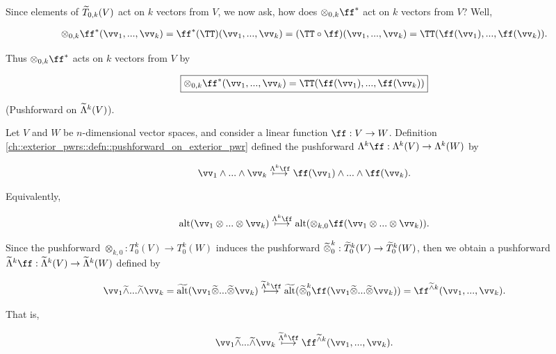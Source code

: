 \begin{deriv}
    Since elements of $\widetilde{T}_{0,k}(V)$ act on $k$ vectors from $V$, we now ask, how does $\otimes_{0, k} \ff^*$ act on $k$ vectors from $V$? Well,
    
    \begin{align*}
        \otimes_{0, k} \ff^*(\vv_1, ..., \vv_k) = \ff^*(\TT)(\vv_1, ..., \vv_k) = (\TT \circ \ff)(\vv_1, ..., \vv_k) = \TT(\ff(\vv_1), ..., \ff(\vv_k)).
    \end{align*}
    
    Thus $\otimes_{0, k} \ff^*$ acts on $k$ vectors from $V$ by
    
    \begin{align*}
        \boxed
        {
            \otimes_{0, k} \ff^*(\vv_1, ..., \vv_k) = \TT(\ff(\vv_1), ..., \ff(\vv_k))
        }
    \end{align*}
\end{deriv}

\begin{deriv}
    (Pushforward on $\widetilde{\Lambda}^k(V)$).
    
    Let $V$ and $W$ be $n$-dimensional vector spaces, and consider a linear function $\ff:V \rightarrow W$. Definition \ref{ch::exterior_pwrs::defn::pushforward_on_exterior_pwr} defined the pushforward $\Lambda^k \ff:\Lambda^k(V) \rightarrow \Lambda^k(W)$ by
    
    \begin{align*}
        \vv_1 \wedge ... \wedge \vv_k \overset{\Lambda^k \ff}{\longmapsto} \ff(\vv_1) \wedge ... \wedge \ff(\vv_k).
    \end{align*}
    
    Equivalently,
    
    \begin{align*}
        \alt(\vv_1 \otimes ... \otimes \vv_k) \overset{\Lambda^k \ff}{\longmapsto} \alt(\otimes_{k, 0} \ff(\vv_1 \otimes ... \otimes 
        \vv_k)).
    \end{align*}
    
    Since the pushforward $\otimes_{k, 0}:T^k_0(V) \rightarrow T^k_0(W)$ induces the pushforward $\widetilde{\otimes}^k_0:\widetilde{T}^k_0(V) \rightarrow \widetilde{T}^k_0(W)$, then we obtain a pushforward $\tLambda^k \ff:\tLambda^k(V) \rightarrow \tLambda^k(W)$ defined by
    
    \begin{align*}
        \vv_1 \twedge ... \twedge \vv_k = \talt(\vv_1 \totimes ... \totimes \vv_k) \overset{\tLambda^k \ff}{\longmapsto} \talt(\totimes^k_0 \ff(\vv_1 \totimes ... \totimes \vv_k)) = \ff^{\twedge k}(\vv_1, ..., \vv_k).
    \end{align*}
    
    That is,
    
    \begin{align*}
        \vv_1 \twedge ... \twedge \vv_k \overset{\tLambda^k \ff}{\longmapsto} \ff^{\twedge k}(\vv_1, ..., \vv_k).
    \end{align*}
\end{deriv}

